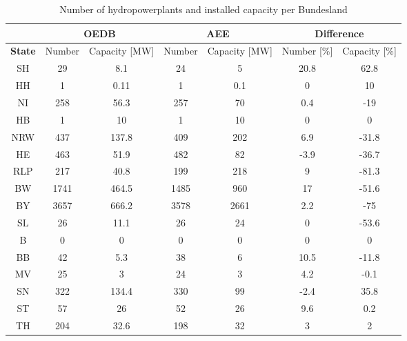 \begin{table}
\footnotesize 
 \caption[Number of hydropowerplants and installed capacity per Bundesland]{Number of hydropowerplants and installed capacity per Bundesland \cite{oedb}\cite{aee}}
 \centering
 \label{oedb_aee_diff}
 \begin{tabular}{|c|cc|cc| cc|}
  \cline{2-7}
  \multicolumn{0}{c|}{} &\multicolumn{2}{|c}{\textbf{OEDB}}&\multicolumn{2}{|c|}{\textbf{AEE}}&\multicolumn{2}{c|}{\textbf{Difference}} \\
  \hline
  \textbf{State} & Number 	& 	Capacity [MW] 	&	Number 	& 	Capacity [MW] 	&	Number [\%] 	&	Capacity [\%] \\
  \hline
  SH	&	29	&	8.1		&	24	&	5		&	20.8		&	62.8	\\
  HH	&	1	&	0.11		&	1	&	0.1		&	0		&	10	\\
  NI	&	258	&	56.3		&	257	&	70		&	0.4		&	-19	\\
  HB	&	1	&	10		&	1	&	10		&	0		&	0	\\
  NRW	&	437	&	137.8		&	409	&	202		&	6.9		&	-31.8	\\
  HE	&	463	&	51.9		&	482	&	82		&	-3.9		&	-36.7	\\
  RLP	&	217	&	40.8		&	199	&	218		&	9		&	-81.3	\\
  BW	&	1741	&	464.5		&	1485	&	960		&	17		&	-51.6	\\	
  BY	&	3657	&	666.2		&	3578	&	2661		&	2.2		&	-75	\\
  SL	&	26	&	11.1		&	26	&	24		&	0		&	-53.6	\\
  B	&	0	&	0		&	0	&	0		&	0		&	0	\\
  BB	&	42	&	5.3		&	38	&	6		&	10.5		&	-11.8	\\
  MV	&	25	&	3		&	24	&	3		&	4.2		&	-0.1	\\
  SN	&	322	&	134.4		&	330	&	99		&	-2.4		&	35.8	\\
  ST	&	57	&	26		&	52	&	26		&	9.6		&	0.2	\\
  TH	&	204	&	32.6		&	198	&	32		&	3		&	2	\\
  \hline
 \end{tabular} 
\end{table}

